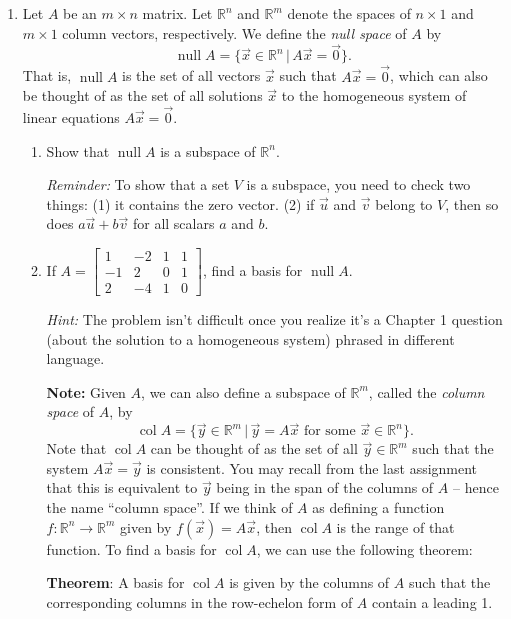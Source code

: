 \documentclass[letterpaper,12pt]{article}
\newcommand{\R}{\mathbb{R}}
\DeclareMathOperator{\nul}{null}
\DeclareMathOperator{\col}{col}
\begin{document}
\begin{enumerate}
\item Let $A$ be an $m\times n$ matrix. Let $\R^n$ and $\R^m$ denote the spaces of $n\times 1$ and $m\times 1$ column vectors, respectively. We define the {\em null space} of $A$ by
\[
 \nul A = \{\vec{x}\in\R^n \,|\, A\vec{x}=\vec{0}\}.
\]
That is, $\nul A$ is the set of all vectors $\vec{x}$ such that $A\vec{x}=\vec{0}$, which can also be thought of as the set of all solutions $\vec{x}$ to the homogeneous system of linear equations $A\vec{x}=\vec{0}$. 
\begin{enumerate}
 \item Show that $\nul A$ is a subspace of $\R^n$.

{\em Reminder:} To show that a set $V$ is a subspace, you need to check two things: (1) it contains the zero vector. (2) if $\vec{u}$ and $\vec{v}$ belong to $V$, then so does $a\vec{u}+b\vec{v}$ for all scalars $a$ and $b$.

 \item If $A = \begin{bmatrix}
                1&-2&1&1\\-1&2&0&1\\2&-4&1&0
               \end{bmatrix}$, find a basis for $\nul A$.

{\em Hint:} The problem isn't difficult once you realize it's a Chapter 1 question (about the solution to a homogeneous system) phrased in different language.


{\bf Note:} Given $A$, we can also define a subspace of $\R^m$, called the {\em column space} of $A$, by 
\[
\col A = \{\vec{y}\in\R^m\,|\, \vec{y}=A\vec{x} \text{ for some } \vec{x}\in\R^n\}.
\]
Note that $\col A$ can be thought of as the set of all $\vec{y}\in\R^m$ such that the system $A\vec{x}=\vec{y}$ is consistent. You may recall from the last assignment that this is equivalent to $\vec{y}$ being in the span of the columns of $A$ -- hence the name ``column space''. If we think of $A$ as defining a function $f:\R^n\to\R^m$ given by $f(\vec{x})=A\vec{x}$, then $\col A$ is the range of that function. To find a basis for $\col A$, we can use the following theorem:

\medskip

{\bf Theorem}: A basis for $\col A$ is given by the columns of $A$ such that the corresponding columns in the row-echelon form of $A$ contain a leading 1.

\medskip


\end{enumerate}
\end{enumerate}
\end{document}
